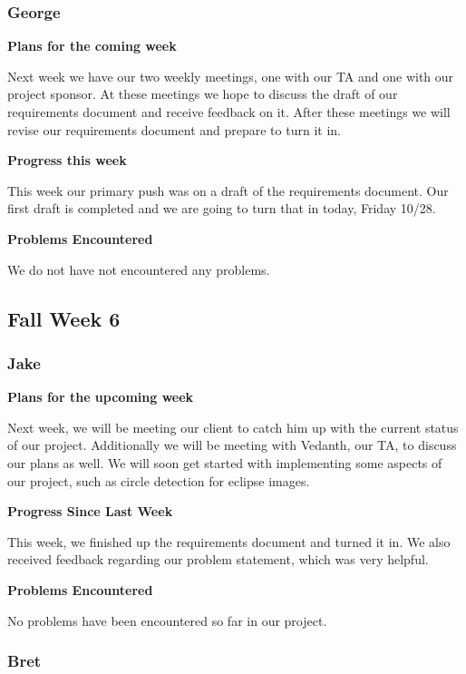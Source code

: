 \documentclass[10pt, onecolumn, draftclsnofoot, letterpaper, compsoc]{IEEEtran}
\begin{document}
    \subsubsection{George}

    \noindent \textbf{Plans for the coming week}

    Next week we have our two weekly meetings, one with our TA and one with our
    project sponsor. At these meetings we hope to discuss the draft of our requirements
    document and receive feedback on it. After these meetings we will revise our
    requirements document and prepare to turn it in.

    \noindent \textbf{Progress this week}

    This week our primary push was on a draft of the requirements document. Our
    first draft is completed and we are going to turn that in today, Friday 10/28.

    \noindent \textbf{Problems Encountered}

    We do not have not encountered any problems.

\subsection{Fall Week 6}

    \subsubsection{Jake}

    \noindent \textbf{Plans for the upcoming week}

    Next week, we will be meeting our client to catch him up with the current
    status of our project. Additionally we will be meeting with Vedanth, our TA,
    to discuss our plans as well. We will soon get started with implementing some
    aspects of our project, such as circle detection for eclipse images.

    \noindent \textbf{Progress Since Last Week}

    This week, we finished up the requirements document and turned it in. We also
    received feedback regarding our problem statement, which was very helpful.

    \noindent \textbf{Problems Encountered}

    No problems have been encountered so far in our project.

    \subsubsection{Bret}
\end{document}
